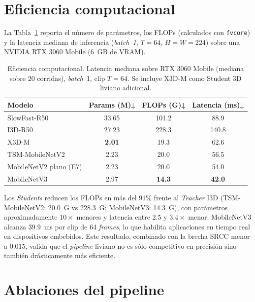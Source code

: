 \section{Eficiencia computacional}
\label{sec:eficiencia}

La Tabla~\ref{tab:eficiencia} reporta el número de parámetros, los \ac{FLOPs} (calculados con \texttt{fvcore}) y la latencia mediana de inferencia (\textit{batch~1}, $T=64$, $H=W=224$) sobre una NVIDIA RTX 3060 Mobile (6~GB de VRAM).

\begin{table}[H]
\centering
\caption{Eficiencia computacional. Latencia mediana sobre RTX 3060 Mobile (mediana sobre 20 corridas), \textit{batch}~1, clip $T=64$. Se incluye X3D-M como Student 3D liviano adicional.}
\label{tab:eficiencia}
\small
\begin{tabular}{lccc}
\toprule
\textbf{Modelo} & \textbf{Params (M)}↓ & \textbf{FLOPs (G)}↓ & \textbf{Latencia (ms)}↓ \\
\midrule
SlowFast-R50    & 33.65        & 101.2         & 88.9           \\
I3D-R50         & 27.23        & 228.3         & 140.8          \\
\midrule
X3D-M           & \textbf{2.01} & 19.3          & 62.6           \\
TSM-MobileNetV2 & 2.23         & 20.0          & 56.5           \\
MobileNetV2 plano (E7) & 2.23  & 20.0          & 54.0           \\
MobileNetV3     & 2.97         & \textbf{14.3} & \textbf{42.0}  \\
\bottomrule
\end{tabular}
\end{table}

Los \textit{Students} reducen los \ac{FLOPs} en más del $91\%$ frente al \textit{Teacher} \ac{I3D} (TSM-MobileNetV2: 20.0~G vs 228.3~G; MobileNetV3: 14.3~G), con parámetros aproximadamente $10\times$ menores y latencia entre $2.5$ y $3.4\times$ menor. MobileNetV3 alcanza 39.9~ms por clip de 64 \textit{frames}, lo que habilita aplicaciones en tiempo real en dispositivos embebidos. Este resultado, combinado con la brecha SRCC menor a $0.015$, valida que el \textit{pipeline} liviano no es sólo competitivo en precisión sino también drásticamente más eficiente.

\section{Ablaciones del pipeline}
\label{sec:ablaciones}

